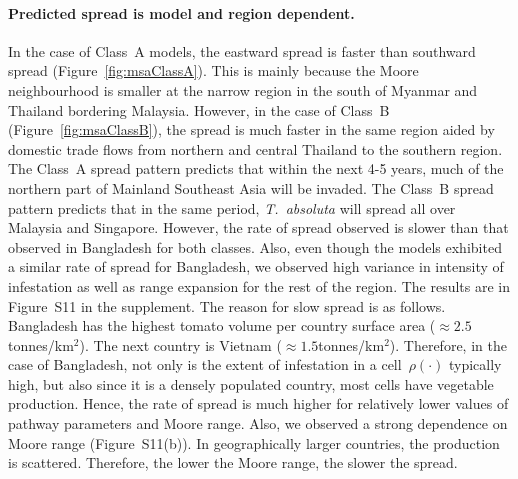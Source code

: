 \documentclass[11pt]{article}
\newcommand{\tuta}{\emph{T.~absoluta}}
\newcommand{\infest}{\rho}
\theoremstyle{definition}
\begin{document}
\paragraph{Predicted spread is model and region dependent.} In the case of
Class~A models, the eastward spread is faster than southward spread
(Figure~\ref{fig:msaClassA}). This is mainly because the Moore
neighbourhood is smaller at the narrow region in the south of Myanmar and
Thailand bordering Malaysia.  However, in the case of Class~B
(Figure~\ref{fig:msaClassB}), the spread is much faster in the same region
aided by domestic trade flows from northern and central Thailand to the
southern region. The Class~A spread pattern predicts that within the next
4-5 years, much of the northern part of Mainland Southeast Asia will be
invaded.  The Class~B spread pattern predicts that in the same period,
\tuta{} will spread all over Malaysia and Singapore.  However, the rate of
spread observed is slower than that observed in Bangladesh for both
classes. Also, even though the models exhibited a similar rate of spread
for Bangladesh, we observed high variance in intensity of infestation as
well as range expansion for the rest of the region. The results are in
Figure~S11 in the supplement. The reason for slow spread
is as follows.  Bangladesh has the highest tomato volume per country
surface area ($\approx2.5$tonnes/km$^2$).  The next country is Vietnam
($\approx1.5$tonnes/km$^2$). Therefore, in the case of Bangladesh, not only
is the extent of infestation in a cell~$\infest(\cdot)$ typically high, but
also since it is a densely populated country, most cells have vegetable
production. Hence, the rate of spread is much higher for relatively lower
values of pathway parameters and Moore range. Also, we observed a strong
dependence on Moore range (Figure~S11(b)).  In
geographically larger countries, the production is scattered. Therefore,
the lower the Moore range, the slower the spread.
\end{document}
